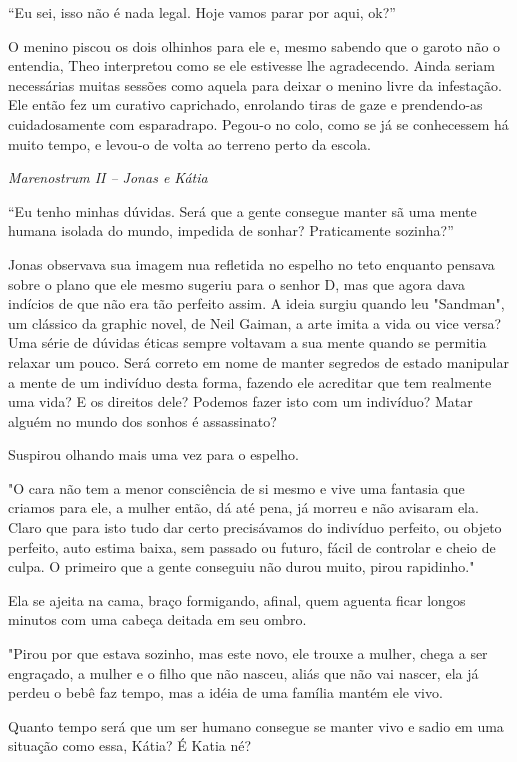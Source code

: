 ``Eu sei, isso não é nada legal. Hoje vamos parar por aqui, ok?''

O menino piscou os dois olhinhos para ele e, mesmo sabendo que o garoto
não o entendia, Theo interpretou como se ele estivesse lhe agradecendo.
Ainda seriam necessárias muitas sessões como aquela para deixar o menino
livre da infestação. Ele então fez um curativo caprichado, enrolando
tiras de gaze e prendendo-as cuidadosamente com esparadrapo. Pegou-o no
colo, como se já se conhecessem há muito tempo, e levou-o de volta ao
terreno perto da escola.

\asterisc

\emph{Marenostrum II -- Jonas e Kátia}

``Eu tenho minhas dúvidas. Será que a gente consegue manter sã uma mente
humana isolada do mundo, impedida de sonhar? Praticamente sozinha?''

Jonas observava sua imagem nua refletida no espelho no teto enquanto
pensava sobre o plano que ele mesmo sugeriu para o senhor D, mas que
agora dava indícios de que não era tão perfeito assim. A ideia surgiu
quando leu "Sandman", um clássico da graphic novel, de Neil Gaiman, a
arte imita a vida ou vice versa? Uma série de dúvidas éticas sempre
voltavam a sua mente quando se permitia relaxar um pouco. Será correto
em nome de manter segredos de estado manipular a mente de um indivíduo
desta forma, fazendo ele acreditar que tem realmente uma vida? E os
direitos dele? Podemos fazer isto com um indivíduo? Matar alguém no
mundo dos sonhos é assassinato?

Suspirou olhando mais uma vez para o espelho.

"O cara não tem a menor consciência de si mesmo e vive uma fantasia que
criamos para ele, a mulher então, dá até pena, já morreu e não avisaram
ela. Claro que para isto tudo dar certo precisávamos do indivíduo
perfeito, ou objeto perfeito, auto estima baixa, sem passado ou futuro,
fácil de controlar e cheio de culpa. O primeiro que a gente conseguiu
não durou muito, pirou rapidinho."

Ela se ajeita na cama, braço formigando, afinal, quem aguenta ficar
longos minutos com uma cabeça deitada em seu ombro.

"Pirou por que estava sozinho, mas este novo, ele trouxe a mulher, chega
a ser engraçado, a mulher e o filho que não nasceu, aliás que não vai
nascer, ela já perdeu o bebê faz tempo, mas a idéia de uma família
mantém ele vivo.

Quanto tempo será que um ser humano consegue se manter vivo e sadio em
uma situação como essa, Kátia? É Katia né?

